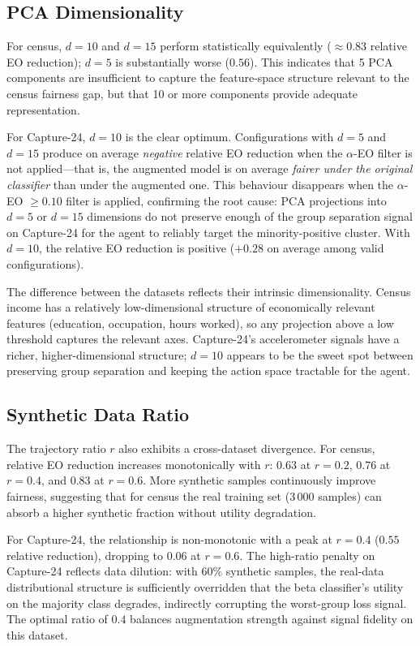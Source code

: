 \documentclass[12pt]{article}
\begin{document}
\subsection{PCA Dimensionality}

For census, $d = 10$ and $d = 15$ perform statistically equivalently
($\approx 0.83$ relative EO reduction); $d = 5$ is substantially worse
($0.56$).
This indicates that 5 PCA components are insufficient to capture the
feature-space structure relevant to the census fairness gap, but that
10 or more components provide adequate representation.

For Capture-24, $d = 10$ is the clear optimum.
Configurations with $d = 5$ and $d = 15$ produce on average \emph{negative}
relative EO reduction when the $\alpha$-EO filter is not applied---that is,
the augmented model is on average \emph{fairer under the original classifier}
than under the augmented one.
This behaviour disappears when the $\alpha$-EO $\geq 0.10$ filter is applied,
confirming the root cause: PCA projections into $d = 5$ or $d = 15$
dimensions do not preserve enough of the group separation signal on
Capture-24 for the agent to reliably target the minority-positive cluster.
With $d = 10$, the relative EO reduction is positive ($+0.28$ on average
among valid configurations).

The difference between the datasets reflects their intrinsic dimensionality.
Census income has a relatively low-dimensional structure of economically
relevant features (education, occupation, hours worked), so any projection
above a low threshold captures the relevant axes.
Capture-24's accelerometer signals have a richer, higher-dimensional
structure; $d = 10$ appears to be the sweet spot between preserving group
separation and keeping the action space tractable for the agent.

\subsection{Synthetic Data Ratio}

The trajectory ratio $r$ also exhibits a cross-dataset divergence.
For census, relative EO reduction increases monotonically with $r$:
$0.63$ at $r = 0.2$, $0.76$ at $r = 0.4$, and $0.83$ at $r = 0.6$.
More synthetic samples continuously improve fairness, suggesting that for
census the real training set ($3\,000$ samples) can absorb a higher synthetic
fraction without utility degradation.

For Capture-24, the relationship is non-monotonic with a peak at $r = 0.4$
($0.55$ relative reduction), dropping to $0.06$ at $r = 0.6$.
The high-ratio penalty on Capture-24 reflects data dilution: with
$60\%$ synthetic samples, the real-data distributional structure is
sufficiently overridden that the beta classifier's utility on the majority
class degrades, indirectly corrupting the worst-group loss signal.
The optimal ratio of $0.4$ balances augmentation strength against signal
fidelity on this dataset.
\end{document}
